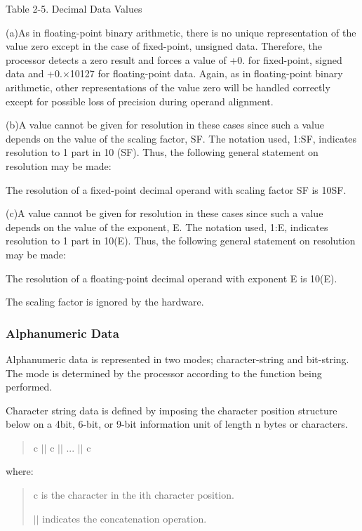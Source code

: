 Table 2-5. Decimal Data Values

(a)As in floating-point binary arithmetic, there is no unique representation of
the value zero except in the case of fixed-point, unsigned data. Therefore, the
processor detects a zero result and forces a value of +0. for fixed-point,
signed data and +0.$\times$10127 for floating-point data. Again, as in
floating-point binary arithmetic, other representations of the value zero will
be handled correctly except for possible loss of precision during operand
alignment.  

(b)A value cannot be given for resolution in these cases since such a value
depends on the value of the scaling factor, SF. The notation used, 1:SF,
indicates resolution to 1 part in 10 (SF). Thus, the following general
statement on resolution may be made: 

The resolution of a fixed-point decimal operand with scaling factor SF is 10SF.


(c)A value cannot be given for resolution in these cases since such a value
depends on the value of the exponent, E. The notation used, 1:E, indicates
resolution to 1 part in 10(E). Thus, the following general statement on
resolution may be made: 

The resolution of a floating-point decimal operand with exponent E is 10(E).

The scaling factor is ignored by the hardware.


\subsubsection{Alphanumeric Data}

Alphanumeric data is represented in two modes; character-string and bit-string.
The mode is determined by the processor according to the function being
performed.



Character string data is defined by imposing the character position structure
below on a 4bit, 6-bit, or 9-bit information unit of length n bytes or
characters.  
\begin{quotation}
c $||$ c $||$ ... $||$ c
\end{quotation}
where:
\begin{quotation}
c is the character in the ith character position.

$||$ indicates the concatenation operation.
\end{quotation}


